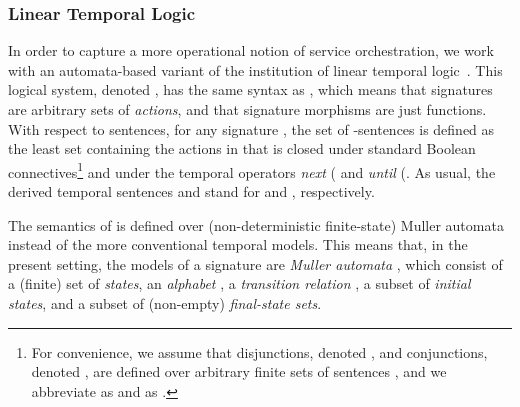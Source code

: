 \documentclass{LMCS}
\begin{document}
\subsubsection*{Linear Temporal Logic}

In order to capture a more operational notion of service orchestration, we work with an automata-based variant of the institution  of linear temporal logic~\cite{Fiadeiro-Costa:A-duality-between-specifications-and-models-of-process-behaviour-1996}.  This logical system, denoted , has the same syntax as , which means that signatures are arbitrary sets of \emph{actions}, and that signature morphisms are just functions.  With respect to sentences, for any signature , the set of \nb-sentences is defined as the least set containing the actions in  that is closed under standard Boolean connectives\footnote{For convenience, we assume that disjunctions, denoted , and conjunctions, denoted , are defined over arbitrary finite sets of sentences , and we abbreviate  as  and  as .} and under the temporal operators \emph{next} ( and \emph{until} (.
As usual, the derived temporal sentences  and  stand for  and , respectively.

{\sloppy The semantics of  is defined over (non-deterministic
  finite-state) Muller automata \cite{Muller:Infinite-sequences-and-finite-machines-1963} instead of the more conventional temporal models.  This means that, in the present setting, the models of a signature  are \emph{Muller automata} , which consist of a (finite) set  of \emph{states}, an \emph{alphabet} , a \emph{transition relation} , a subset  of \emph{initial states}, and a subset  of (non-empty) \emph{final-state sets}.}
\end{document}
